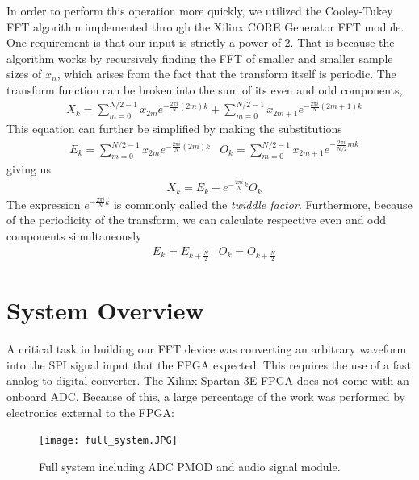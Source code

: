 \documentclass[12pt]{article}
\begin{document}
    In order to perform this operation more quickly, we utilized the Cooley-Tukey FFT algorithm implemented through the Xilinx CORE Generator FFT module.
    One requirement is that our input is strictly a power of 2.
    That is because the algorithm works by recursively finding the FFT of smaller and smaller sample sizes of $x_n$, which arises from the fact that the transform itself is periodic.
    The transform function can be broken into the sum of its even and odd components,
    \begin{align*}
        &X_k = \sum \limits_{m=0}^{N/2-1} x_{2m}e^{-\frac{2\pi i}{N} (2m)k} + \sum \limits_{m=0}^{N/ 2-1} x_{2m+1} e^{-\frac{2\pi i}{N} (2m+1)k}
    \end{align*}
    This equation can further be simplified by making the substitutions
    \begin{align*}
        &E_k = \sum \limits_{m=0}^{N/2-1} x_{2m}e^{-\frac{2\pi i}{N} (2m)k}
        &O_k = \sum \limits_{m=0}^{N/2-1} x_{2m+1} e^{-\frac{2\pi i}{N/2} mk}
    \end{align*}
    giving us
    \begin{align*}
        &X_k = E_k + e^{-\frac{2\pi i}{N} k} O_k
    \end{align*}
    The expression $e^{-\frac{2\pi i}{N}k}$ is commonly called the \textit{twiddle factor}.
    Furthermore, because of the periodicity of the transform, we can calculate respective even and   odd components simultaneously
    \begin{align*}
        &E_k = E_{k+\frac{N}{2}}
        &O_k = O_{k+\frac{N}{2}}
    \end{align*}
  
  \section*{System Overview}
    A critical task in building our FFT device was converting an arbitrary waveform into the SPI signal input that the FPGA expected. This requires the use of a fast analog to digital converter. The Xilinx Spartan-3E FPGA does not come with an onboard ADC. Because of this, a large percentage of the work was performed by electronics external to the FPGA:

    \begin{figure}[H]
      \centering
      \texttt{[image: full\_system.JPG]}
      \caption{Full system including ADC PMOD and audio signal module.}
      \label{overflow}
    \end{figure}
    
\end{document}
